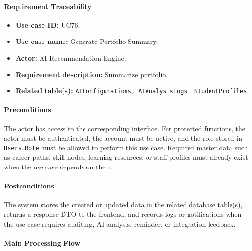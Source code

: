 \paragraph{Requirement Traceability}

\begin{itemize}
    \item \textbf{Use case ID:} UC76.
    \item \textbf{Use case name:} Generate Portfolio Summary.
    \item \textbf{Actor:} AI Recommendation Engine.
    \item \textbf{Requirement description:} Summarize portfolio.
    \item \textbf{Related table(s):} \texttt{AIConfigurations, AIAnalysisLogs, StudentProfiles}.
\end{itemize}

\paragraph{Preconditions}

The actor has access to the corresponding interface. For protected functions, the actor must be authenticated, the account must be active, and the role stored in \texttt{Users.Role} must be allowed to perform this use case. Required master data such as career paths, skill nodes, learning resources, or staff profiles must already exist when the use case depends on them.

\paragraph{Postconditions}

The system stores the created or updated data in the related database table(s), returns a response DTO to the frontend, and records logs or notifications when the use case requires auditing, AI analysis, reminder, or integration feedback.

\paragraph{Main Processing Flow}

